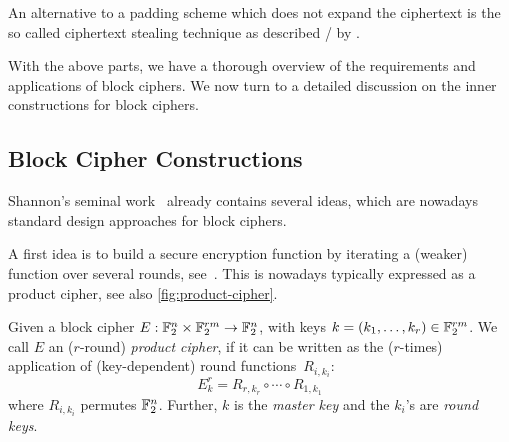 An alternative to a padding scheme which does not expand the ciphertext is the so called ciphertext stealing technique as described \eg/ by \textcite[Section~2.4]{meyermatyas}.

With the above parts, we have a thorough overview of the requirements and applications of block ciphers.
We now turn to a detailed discussion on the inner constructions for block ciphers.

\subsection{Block Cipher Constructions}\label{sec:prelim:bcc}
Shannon's seminal work~\cite{shannon45,Shannon49} already contains several ideas, which are nowadays standard design approaches for block ciphers.

A first idea is to build a secure encryption function by iterating a (weaker) function over several rounds, see~\cite[Sections~37 and~38]{shannon45}.
This is nowadays typically expressed as a product cipher, see also \cref{fig:product-cipher}.

\begin{definition}\label{def:product-cipher}
    Given a block cipher $E : \mathbb{F}_2^n \times \mathbb{F}_2^{rm} \to \mathbb{F}_2^n$, with keys $k = (k_1, \ldots, k_r) \in \mathbb{F}_2^{rm}$.
    We call $E$ an ($r$-round) \emph{product cipher}, if it can be written as the ($r$-times) application of (key-dependent) round functions~$R_{i,k_i}$:
    \begin{equation*}
        E_k^r = R_{r,k_r} \circ \cdots \circ R_{1,k_1}
    \end{equation*}
    where $R_{i,k_i}$ permutes $\mathbb{F}_2^n$.
    Further, $k$ is the \emph{master key} and the $k_i$'s are \emph{round keys}.
\end{definition}

